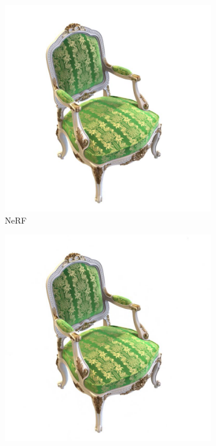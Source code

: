 \documentclass[12pt, a4paper, twoside]{book}
\numberwithin{equation}{chapter}
\numberwithin{theorem}{section}
\numberwithin{definition}{section}
\numberwithin{definitionChapter}{chapter}
\begin{document}
	\begin{figure}[H]
		\centering
		\begin{subfigure}{0.3\textwidth}
			\centering
			\includegraphics[scale=0.2]{img/nerf/nerf_chair_38.jpg}
			\caption{NeRF}
		\end{subfigure}
		\begin{subfigure}{0.3\textwidth}
			\centering
			\includegraphics[scale=0.2]{img/mipnerf/mipnerf_chair_38.jpg}

\end{subfigure}
\end{figure}
\end{document}
